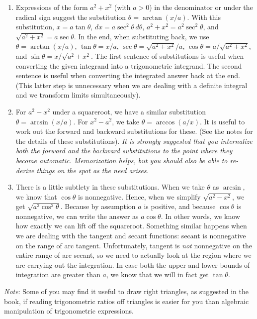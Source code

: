 \documentclass[10pt]{amsart}
\begin{document}
\begin{enumerate}
\item Expressions of the form $a^2 + x^2$ (with $a > 0$) in the
  denominator or under the radical sign suggest the substitution
  $\theta = \arctan(x/a)$. With this substitution, $x = a \tan
  \theta$, $dx = a \sec^2 \theta \, d\theta$, $a^2 + x^2 = a^2 \sec^2
  \theta$, and $\sqrt{a^2 + x^2} = a \sec \theta$. In the end, when
  substituting back, we use $\theta = \arctan(x/a)$, $\tan \theta =
  x/a$, $\sec \theta = \sqrt{a^2 + x^2}/a$, $\cos \theta = a/\sqrt{a^2
  + x^2}$, and $\sin \theta = x/\sqrt{a^2 + x^2}$. The first sentence
  of substitutions is useful when converting the given integrand into
  a trigonometric integrand. The second sentence is useful when
  converting the integrated answer back at the end. (This latter step
  is unnecessary when we are dealing with a definite integral and we
  transform limits simultaneously).
\item For $a^2 - x^2$ under a squareroot, we have a similar
  substitution $\theta = \arcsin(x/a)$. For $x^2 - a^2$, we take
  $\theta = \arccos(a/x)$. It is useful to work out the forward and
  backward substitutions for these. (See the notes for the details of
  these substitutions). {\em It is strongly suggested that you
  internalize both the forward and the backward substitutions to the
  point where they become automatic. Memorization helps, but you
  should also be able to re-derive things on the spot as the need
  arises.}
\item There is a little subtlety in these substitutions. When we take
  $\theta$ as $\arcsin$, we know that $\cos \theta$ is
  nonnegative. Hence, when we simplify $\sqrt{a^2 - x^2}$, we get
  $\sqrt{a^2\cos^2 \theta}$. Because by assumption $a$ is positive,
  and because $\cos \theta$ is nonnegative, we can write the answer as
  $a\cos \theta$. In other words, we know how exactly we can lift off
  the squareroot. Something similar happens when we are dealing with
  the tangent and secant functions: secant is nonnegative on the range
  of arc tangent. Unfortunately, tangent is {\em not} nonnegative on
  the entire range of arc secant, so we need to actually look at the
  region where we are carrying out the integration. In case both the
  upper and lower bounds of integration are greater than $a$, we know
  that we will in fact get $\tan \theta$.
\end{enumerate}

{\em Note}: Some of you may find it useful to draw right triangles, as
suggested in the book, if reading trigonometric ratios off triangles
is easier for you than algebraic manipulation of trigonometric
expressions.
\end{document}
